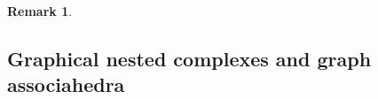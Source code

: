 \documentclass{amsart}
\theoremstyle{definition}
\newtheorem{remark}[theorem]{Remark}
\begin{document}
\begin{remark}





\end{remark}



\subsection{Graphical nested complexes and graph associahedra}
\label{subsec:typeConeGA}
\end{document}
